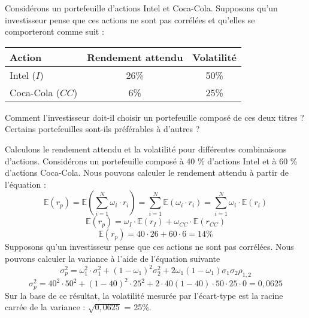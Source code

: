 \documentclass[a4paper, 12pt]{report}
\begin{document}
Considérons un portefeuille d'actions Intel et Coca-Cola. Supposons qu'un investisseur pense que ces actions ne sont pas corrélées et qu'elles se comporteront comme suit :

\begin{center}
	\begin{tabular}{@{}lcc@{}}
	\toprule
	Action    & Rendement attendu & Volatilité \\ \midrule
	Intel ($I$)     & 26\%              & 50\%       \\
	Coca-Cola ($CC$) & 6\%               & 25\%       \\ \bottomrule
\end{tabular}
\end{center}
Comment l'investisseur doit-il choisir un portefeuille composé de ces deux titres ? Certains portefeuilles sont-ils préférables à d'autres ?

Calculons le rendement attendu et la volatilité pour différentes combinaisons d'actions. Considérons un portefeuille composé à 40 \% d'actions Intel et à 60 \% d'actions Coca-Cola. Nous pouvons calculer le rendement attendu à partir de l'équation :
$$
\mathbb{E}(r_p)=\mathbb{E} \left(\sum_{i=1}^{N}\omega_i\cdot r_i \right)=\sum_{i=1}^{N}\mathbb{E}(\omega_i\cdot r_i)=\sum_{i=1}^{N}\omega_i\cdot\mathbb{E}(r_i)
$$
$$
\mathbb{E}(r_p)=\omega_I\cdot\mathbb{E}(r_I)+\omega_{CC}\cdot\mathbb{E}(r_{CC})
$$
$$
\mathbb{E}(r_p)=40\cdot26+60\cdot6=14\%
$$
Supposons qu'un investisseur pense que ces actions ne sont pas corrélées. Nous pouvons calculer la variance à l'aide de l'équation suivante
$$
\sigma_p^2=\omega_1^2\cdot\sigma_1^2+(1-\omega_1)^2\sigma_2^2+2\omega_1(1-\omega_1)\sigma_1\sigma_2\rho_{1,2}
$$
$$
\sigma_p^2=40^2\cdot50^2+(1-40)^2\cdot25^2+2\cdot40(1-40)\cdot50\cdot25\cdot0=0,0625
$$
Sur la base de ce résultat, la volatilité mesurée par l'écart-type est la racine carrée de la variance : $\sqrt{0,0625}$ = 25\%.
\end{document}
